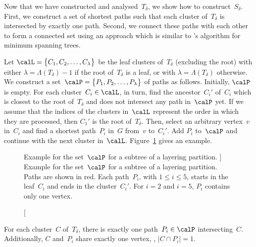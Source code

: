 Now that we have constructed and analysed~$T_\delta$, we show how to construct~$S_\delta$.
First, we construct a set of shortest paths such that each cluster of~$T_\delta$ is intersected by exactly one path.
Second, we connect these paths with each other to form a connected set using an approach which is similar to 's algorithm for minimum spanning trees.

Let $\calL = \big \{ C_1, C_2, \ldots, C_\lambda \big \}$ be the leaf clusters of~$T_\delta$ (excluding the root) with either $\lambda = \Lambda(T_\delta) - 1$ if the root of~$T_\delta$ is a leaf, or with  $\lambda = \Lambda(T_\delta)$ otherwise.
We construct a set~$\calP = \big \{ P_1, P_2, \ldots, P_\lambda \big \}$ of paths as follows.
Initially, $\calP$ is empty.
For each cluster~$C_i \in \calL$, in turn, find the ancestor~$C_i'$ of~$C_i$ which is closest to the root of~$T_\delta$ and does not intersect any path in~$\calP$ yet.
If we assume that the indices of the clusters in~$\calL$ represent the order in which they are processed, then $C_1'$ is the root of~$T_\delta$.
Then, select an arbitrary vertex~$v$ in~$C_i$ and find a shortest path~$P_i$ in~$G$ from~$v$ to~$C_i'$.
Add $P_i$ to~$\calP$ and continue with the next cluster in~$\calL$.
Figure~\ref{fig:LayPartPaths} gives an example.

\begin{figure}
    [htb]
    \centering
    
    \caption
    [%
        Example for the set~$\calP$ for a subtree of a layering partition.
    ]
    {%
        Example for the set~$\calP$ for a subtree of a layering partition.
        Paths are shown in red.
        Each path~$P_i$, with $1 \leq i \leq 5$, starts in the leaf~$C_i$ and ends in the cluster~$C_i'$.
        For $i = 2$ and $i = 5$, $P_i$ contains only one vertex.
    }
    \label{fig:LayPartPaths}
\end{figure}


\begin{lemma}
    \label{lem:clusterPath}
For each cluster~\( C \) of~\( T_\delta \), there is exactly one path~\( P_i \in \calP \) intersecting~\( C \).
Additionally, \( C \) and~\( P_i \) share exactly one vertex, \ie, \( |C \cap P_i| = 1 \).
\end{lemma}


